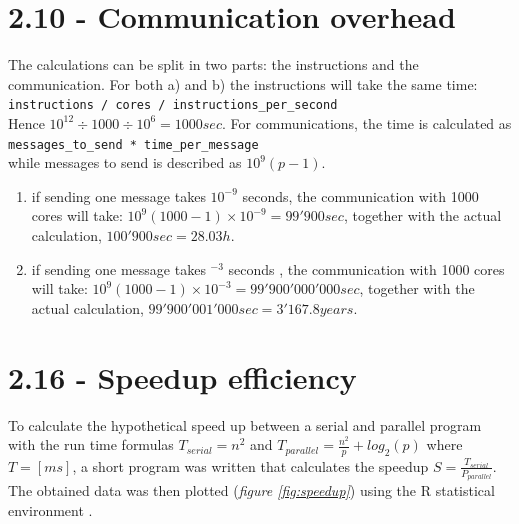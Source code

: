 \documentclass[a4paper,11pt,twoside]{article}
\begin{document}
\section{2.10 - Communication overhead}
The calculations can be split in two parts: the instructions and the communication. For both a) and b) the instructions will take the same time:\\
\verb+instructions / cores / instructions_per_second+\\
Hence $10^{12} \div 1000 \div 10^{6} = 1000 sec$. For communications, the time is calculated as\\
\verb+messages_to_send * time_per_message+\\
while messages to send is described as $10^{9}(p-1)$. 
\begin{enumerate}[label={\alph*)}]
\item if sending one message takes $10^{-9}$ seconds, the communication with 1000 cores will take: $10^{9}(1000-1) \times 10^{-9} = 99'900 sec$, together with the actual calculation, $100'900 sec = 28.03h$.
\item if sending one message takes $^{-3}$ seconds , the communication with 1000 cores will take: $10^{9}(1000-1) \times 10^{-3} = 99'900'000'000 sec$, together with the actual calculation, $99'900'001'000 sec = 3'167.8 years$.
\end{enumerate}


    
\section{2.16 - Speedup efficiency}
To calculate the hypothetical speed up between a serial and parallel program with the run time formulas $T_{serial}=n^{2}$ and $T_{parallel} = \frac{n^{2}}{p}+log_{2}(p)$ where $T=[ms]$, a short program was written that calculates the speedup $S=\frac{T_{serial}}{P_{parallel}}$. The obtained data was then plotted (\textit{figure \ref{fig:speedup}}) using the R statistical environment \cite{rlanguage}.
\end{document}
